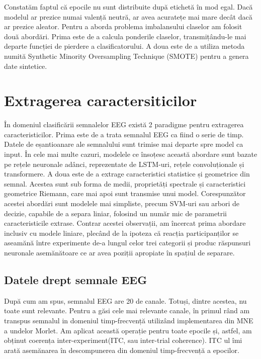 Constatăm faptul că epocile nu sunt distribuite după etichetă în mod egal. Dacă modelul ar prezice numai valență neutră, ar avea acuratețe mai mare decât dacă ar prezice aleator. Pentru a aborda problema imbalansului claselor am folosit două abordări. Prima este de a calcula ponderile claselor, transmițându-le mai departe funcției de pierdere a clasificatorului. A doua este de a utiliza metoda numită Synthetic Minority Oversampling Technique (SMOTE)\cite{imblearn} pentru a genera date sintetice.

\section{Extragerea caractersiticilor}
În domeniul clasificării semnalelor EEG există 2 paradigme pentru extragerea caracteristicilor. Prima este de a trata semnalul EEG ca fiind o serie de timp. Datele de eșantioanare ale semnalului sunt trimise mai departe spre model ca input. În cele mai multe cazuri, modelele ce însoțesc această abordare sunt bazate pe rețele neuronale adânci, reprezentate de LSTM-uri, rețele convoluționale și transformere. A doua este de a extrage caracteristici statistice și geometrice din semnal. Acestea sunt sub forma de medii, proprietăți spectrale și caracteristici geometrice Riemann, care mai apoi sunt transmise unui model. Corespunzător acestei abordări sunt modelele mai simpliste, precum SVM-uri sau arbori de decizie, capabile de a separa liniar, folosind un număr mic de parametrii caracteristicile extrase. Contrar acestei observații, am încercat prima abordare inclusiv cu modele liniare, plecând de la ipoteza că reacția participanților se aseamănă între experimente de-a lungul celor trei categorii și produc răspunsuri neuronale asemănătoare ce ar avea poziții apropiate în spațiul de separare.


\subsection{Datele drept semnale EEG}
După cum am spus, semnalul EEG are 20 de canale. Totuși, dintre acestea, nu toate sunt relevante. Pentru a găsi cele mai relevante canale, în primul rând am transpus semnalul in domeniul timp-frecvență utilizând implementarea din MNE\cite{MNE} a undelor Morlet. Am aplicat această operație pentru toate epocile și, astfel, am obținut coerența inter-experiment(ITC, sau inter-trial coherence). ITC ul îmi arată asemănarea în descompunerea din domeniul timp-frecvență a epocilor.

